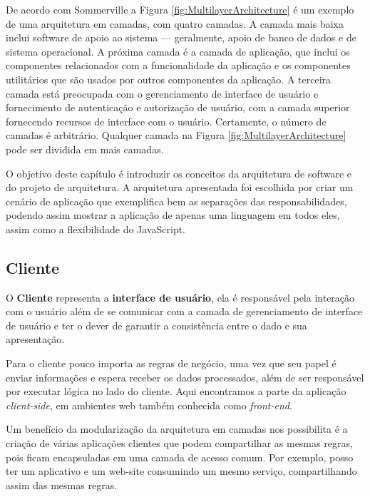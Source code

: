 \documentclass[
	12pt,				%
	openright,			%
	twoside,			%
	a4paper,			%
	english,			%
	brazil				%
	]{abntex2}
\begin{document}
De acordo com Sommerville\cite{sommerville_engenharia} a Figura \ref{fig:MultilayerArchitecture} é um exemplo de uma arquitetura em camadas, com quatro camadas. A camada mais baixa inclui software de apoio ao sistema — geralmente, apoio de banco de dados e de sistema operacional. A próxima camada é a camada de aplicação, que inclui os componentes relacionados com a funcionalidade da aplicação e os componentes utilitários que são usados por outros componentes da aplicação. A terceira camada está preocupada com o gerenciamento de interface de usuário e fornecimento de autenticação e autorização de usuário, com a camada superior fornecendo recursos de interface com o usuário. Certamente, o número de camadas é arbitrário. Qualquer camada na Figura \ref{fig:MultilayerArchitecture} pode ser dividida em mais camadas.


O objetivo deste capítulo é introduzir os conceitos da arquitetura de software e do projeto de arquitetura. A arquitetura apresentada foi escolhida por criar um cenário de aplicação que exemplifica bem as separações das responsabilidades, podendo assim mostrar a aplicação de apenas uma linguagem em todos eles, assim como a flexibilidade do JavaScript.

\subsection{Cliente}
\label{subsec:Cliente}

O \textbf{Cliente} representa a \textbf{interface de usuário}, ela é responsável pela interação com o usuário além de se comunicar com a camada de gerenciamento de interface de usuário e ter o dever de garantir a consistência entre o dado e sua apresentação.

Para o cliente pouco importa as regras de negócio, uma vez que seu papel é enviar informações e espera receber os dados processados, além de ser responsável por executar lógica no lado do cliente. Aqui encontramos a parte da aplicação \textit{client-side}, em ambientes web também conhecida como \textit{front-end}.

Um benefício da modularização da arquitetura em camadas nos possibilita é a criação de várias aplicações clientes que podem compartilhar as mesmas regras, pois ficam encapsuladas em uma camada de acesso comum. Por exemplo, posso ter um aplicativo e um web-site consumindo um mesmo serviço, compartilhando assim das mesmas regras.
\end{document}
